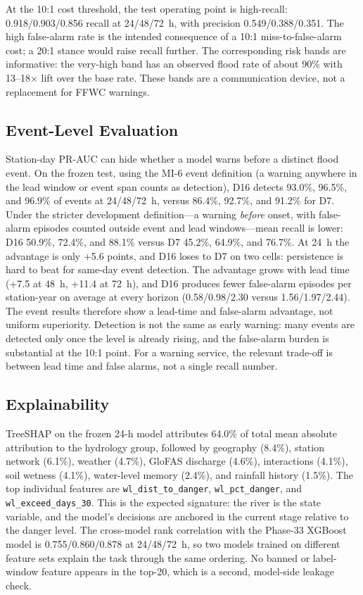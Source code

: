 \documentclass[conference]{IEEEtran}
\begin{document}
At the 10:1 cost threshold, the test operating point is high-recall: 0.918/0.903/0.856 recall at 24/48/72~h, with precision 0.549/0.388/0.351. The high false-alarm rate is the intended consequence of a 10:1 miss-to-false-alarm cost; a 20:1 stance would raise recall further. The corresponding risk bands are informative: the very-high band has an observed flood rate of about 90\% with 13--18$\times$ lift over the base rate. These bands are a communication device, not a replacement for FFWC warnings.

\subsection{Event-Level Evaluation}

Station-day PR-AUC can hide whether a model warns before a distinct flood event. On the frozen test, using the MI-6 event definition (a warning anywhere in the lead window or event span counts as detection), D16 detects 93.0\%, 96.5\%, and 96.9\% of events at 24/48/72~h, versus 86.4\%, 92.7\%, and 91.2\% for D7. Under the stricter development definition---a warning \emph{before} onset, with false-alarm episodes counted outside event and lead windows---mean recall is lower: D16 50.9\%, 72.4\%, and 88.1\% versus D7 45.2\%, 64.9\%, and 76.7\%. At 24~h the advantage is only +5.6 points, and D16 loses to D7 on two cells: persistence is hard to beat for same-day event detection. The advantage grows with lead time (+7.5 at 48~h, +11.4 at 72~h), and D16 produces fewer false-alarm episodes per station-year on average at every horizon (0.58/0.98/2.30 versus 1.56/1.97/2.44). The event results therefore show a lead-time and false-alarm advantage, not uniform superiority. Detection is not the same as early warning: many events are detected only once the level is already rising, and the false-alarm burden is substantial at the 10:1 point. For a warning service, the relevant trade-off is between lead time and false alarms, not a single recall number.

\subsection{Explainability}

TreeSHAP on the frozen 24-h model attributes 64.0\% of total mean absolute attribution to the hydrology group, followed by geography (8.4\%), station network (6.1\%), weather (4.7\%), GloFAS discharge (4.6\%), interactions (4.1\%), soil wetness (4.1\%), water-level memory (2.4\%), and rainfall history (1.5\%). The top individual features are \texttt{wl\_dist\_to\_danger}, \texttt{wl\_pct\_danger}, and \texttt{wl\_exceed\_days\_30}. This is the expected signature: the river is the state variable, and the model's decisions are anchored in the current stage relative to the danger level. The cross-model rank correlation with the Phase-33 XGBoost model is 0.755/0.860/0.878 at 24/48/72~h, so two models trained on different feature sets explain the task through the same ordering. No banned or label-window feature appears in the top-20, which is a second, model-side leakage check.
\end{document}
